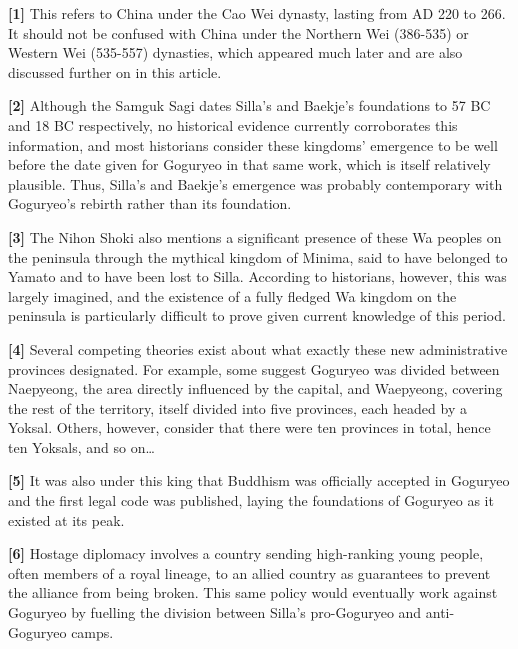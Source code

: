 \documentclass[11pt,a4paper]{article}
\begin{document}
\textbf{{[}1{]}} This refers to China under the Cao Wei dynasty, lasting from AD 220 to 266. It should not be confused with China under the Northern Wei (386-535) or Western Wei (535-557) dynasties, which appeared much later and are also discussed further on in this article.

\textbf{{[}2{]}} Although the Samguk Sagi dates Silla's and Baekje's foundations to 57 BC and 18 BC respectively, no historical evidence currently corroborates this information, and most historians consider these kingdoms' emergence to be well before the date given for Goguryeo in that same work, which is itself relatively plausible. Thus, Silla's and Baekje's emergence was probably contemporary with Goguryeo's rebirth rather than its foundation.

\textbf{{[}3{]}} The Nihon Shoki also mentions a significant presence of these Wa peoples on the peninsula through the mythical kingdom of Minima, said to have belonged to Yamato and to have been lost to Silla. According to historians, however, this was largely imagined, and the existence of a fully fledged Wa kingdom on the peninsula is particularly difficult to prove given current knowledge of this period.

\textbf{{[}4{]}} Several competing theories exist about what exactly these new administrative provinces designated. For example, some suggest Goguryeo was divided between Naepyeong, the area directly influenced by the capital, and Waepyeong, covering the rest of the territory, itself divided into five provinces, each headed by a Yoksal. Others, however, consider that there were ten provinces in total, hence ten Yoksals, and so on\ldots{}

\textbf{{[}5{]}} It was also under this king that Buddhism was officially accepted in Goguryeo and the first legal code was published, laying the foundations of Goguryeo as it existed at its peak.

\textbf{{[}6{]}} Hostage diplomacy involves a country sending high-ranking young people, often members of a royal lineage, to an allied country as guarantees to prevent the alliance from being broken. This same policy would eventually work against Goguryeo by fuelling the division between Silla's pro-Goguryeo and anti-Goguryeo camps.
\end{document}
